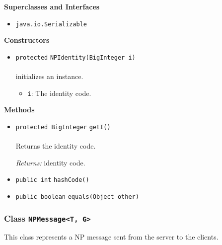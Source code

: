 \textbf{\sffamily Superclasses and Interfaces}
\begin{itemize}
\item \lstinline|java.io.Serializable|
\end{itemize}


\textbf{\sffamily Constructors}
\begin{itemize}
\item \lstinline|protected| \lstinline|NPIdentity|\lstinline|(BigInteger i)|\\ \\[-0.6em]
initializes an instance.
\begin{itemize}
\item \lstinline|i|: The identity code.
\end{itemize}



\end{itemize}


\textbf{\sffamily Methods}
\begin{itemize}
\item \lstinline|protected BigInteger| \lstinline|getI|\lstinline|()|\\ \\[-0.6em]
Returns the identity code.

\emph{Returns:} identity code.

\item \lstinline|public int| \lstinline|hashCode|\lstinline|()| \\[-0.6em]




\item \lstinline|public boolean| \lstinline|equals|\lstinline|(Object other)| \\[-0.6em]




\end{itemize}

\subsubsection{Class \lstinline|NPMessage<T, G>|}
This class represents a NP message sent from the
 server to the clients. \\
\noindent\begin{minipage}[t]{5cm}
\vspace{0.3em}
\hspace*{2em}
\vspace{0.3em}
\end{minipage}

